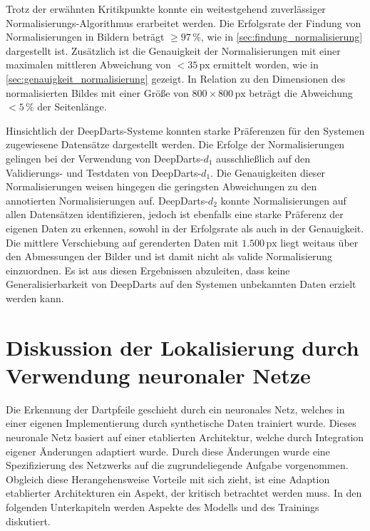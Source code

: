 Trotz der erwähnten Kritikpunkte konnte ein weitestgehend zuverlässiger Normalisierungs-Algorithmus erarbeitet werden. Die Erfolgsrate der Findung von Normalisierungen in Bildern beträgt $\geq 97\,\%$, wie in \autoref{sec:findung_normalisierung} dargestellt ist. Zusätzlich ist die Genauigkeit der Normalisierungen mit einer maximalen mittleren Abweichung von $<35\,\text{px}$ ermittelt worden, wie in \autoref{sec:genauigkeit_normalisierung} gezeigt. In Relation zu den Dimensionen des normalisierten Bildes mit einer Größe von $800 \times 800\,\text{px}$ beträgt die Abweichung $<5\,\%$ der Seitenlänge.

Hinsichtlich der DeepDarts-Systeme konnten starke Präferenzen für den Systemen zugewiesene Datensätze dargestellt werden. Die Erfolge der Normalisierungen gelingen bei der Verwendung von DeepDarts-$d_1$ ausschließlich auf den Validierungs- und Testdaten von DeepDarts-$d_1$. Die Genauigkeiten dieser Normalisierungen weisen hingegen die geringsten Abweichungen zu den annotierten Normalisierungen auf. DeepDarts-$d_2$ konnte Normalisierungen auf allen Datensätzen identifizieren, jedoch ist ebenfalls eine starke Präferenz der eigenen Daten zu erkennen, sowohl in der Erfolgsrate als auch in der Genauigkeit. Die mittlere Verschiebung auf gerenderten Daten mit $1.500\,\text{px}$ liegt weitaus über den Abmessungen der Bilder und ist damit nicht als valide Normalisierung einzuordnen. Es ist aus diesen Ergebnissen abzuleiten, dass keine Generalisierbarkeit von DeepDarts auf den Systemen unbekannten Daten erzielt werden kann.



\section{Diskussion der Lokalisierung durch Verwendung neuronaler Netze}
\label{sec:diskussion:ki}

Die Erkennung der Dartpfeile geschieht durch ein neuronales Netz, welches in einer eigenen Implementierung durch synthetische Daten trainiert wurde. Dieses neuronale Netz basiert auf einer etablierten Architektur, welche durch Integration eigener Änderungen adaptiert wurde. Durch diese Änderungen wurde eine Spezifizierung des Netzwerks auf die zugrundeliegende Aufgabe vorgenommen. Obgleich diese Herangehensweise Vorteile mit sich zieht, ist eine Adaption etablierter Architekturen ein Aspekt, der kritisch betrachtet werden muss. In den folgenden Unterkapiteln werden Aspekte des Modells und des Trainings diskutiert.


